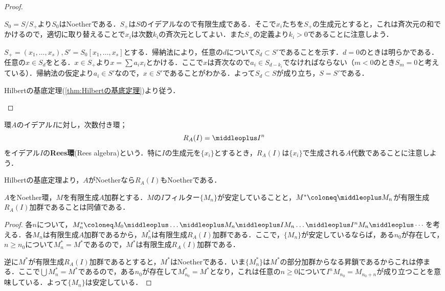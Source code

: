 \begin{proof}
	\begin{eqv}
		\item $S_0=S/S_+$より$S_0$はNoetherである．$S_+$は$S$のイデアルなので有限生成である．そこで$x_i$たちを$S_+$の生成元とすると，これは斉次元の和でかけるので，適切に取り替えることで$x_i$は次数$k_i$の斉次元としてよい．また$S_+$の定義より$k_i>0$であることに注意しよう．
		
		$S_+=(x_1,\dots,x_s), S'=S_0[x_1,\dots,x_s]$とする．帰納法により，任意の$d$について$S_d\subset S'$であることを示す．$d=0$のときは明らかである．任意の$x\in S_d$をとる．$x\in S_+$より$x=\sum a_ix_i$とかける．ここで$x$は斉次なので$a_i\in S_{d-k_i}$でなければならない（$m<0$のとき$S_m=0$と考えている）．帰納法の仮定より$a_i\in S'$なので，$x\in S'$であることがわかる．よって$S_d\subset S$が成り立ち，$S=S'$である．
		
		\item Hilbertの基底定理(\ref{thm:Hilbertの基底定理})より従う．
	\end{eqv}
\end{proof}

\begin{defi}[Rees環]
	環$A$のイデアル$I$に対し，次数付き環；
	\[R_A(I)=\middleoplus I^n\]
	をイデアル$I$の\textbf{Rees環}(Rees algebra)という．特に$I$の生成元を$\{x_i\}$とするとき，$R_A(I)$は$\{x_i\}$で生成される$A$代数であることに注意しよう．
\end{defi}

Hilbertの基底定理より，$A$がNoetherなら$R_A(I)$もNoetherである．

\begin{lem}
	$A$をNoether環，$M$を有限生成$A$加群とする．$M$の$I$フィルター$\{M_n\}$が安定していることと，$M^\ast\coloneq \middleoplus M_n$が有限生成$R_A(I)$加群であることは同値である．
\end{lem}

\begin{proof}
	各$n$について，$M_n^\ast\coloneq M_0\middleoplus\dots\middleoplus M_n\middleoplus IM_n\dots\middleoplus I^nM_n\middleoplus\cdots$を考える．各$M_n$は有限生成$A$加群であるから，$M_n^\ast$は有限生成$R_A(I)$加群である．ここで，$\{M_n\}$が安定しているならば，ある$n_0$が存在して，$n\geq n_0$について$M_n^\ast=M^\ast$であるので，$M^\ast$は有限生成$R_A(I)$加群である．
	
	逆に$M^\ast$が有限生成$R_A(I)$加群であるとすると，$M^\ast$はNoetherである．いま$\{M_n^\ast\}$は$M^\ast$の部分加群からなる昇鎖であるからこれは停まる．ここで$\bigcup M_n^\ast=M^\ast$であるので，ある$n_0$が存在して$M_{n_0}^\ast=M^\ast$となり，これは任意の$n\geq0$について$I^nM_{n_0}=M_{n_0+n}$が成り立つことを意味している．よって$\{M_n\}$は安定している．
\end{proof}

